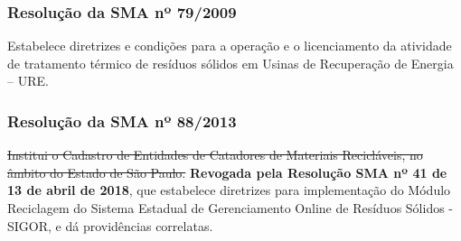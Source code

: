 \begin{subapend}
\begin{subsubapend}
		\subsubsection{Resolução da SMA nº 79/2009}
		Estabelece diretrizes e condições para a operação e o licenciamento da atividade de tratamento térmico de resíduos sólidos em Usinas de Recuperação de Energia – URE.
		\subsubsection{Resolução da SMA nº 88/2013}
		\sout{Institui o Cadastro de Entidades de Catadores de Materiais Recicláveis, no âmbito do Estado de São Paulo.}
		\textbf{Revogada pela Resolução SMA nº 41 de 13 de abril de 2018}, que estabelece diretrizes para implementação do Módulo Reciclagem do Sistema Estadual de Gerenciamento Online de Resíduos Sólidos - SIGOR, e dá providências correlatas.
	\end{subsubapend}
\end{subapend}


